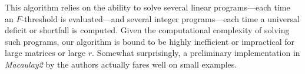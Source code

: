 \documentclass{amsart}
\begin{document}
\begin{remark}[An algorithm]
  This algorithm relies on the ability to solve several linear programs---each time an $F$-threshold is evaluated---and several integer programs---each time a universal deficit or shortfall is computed.
   Given the computational complexity of solving such programs, our algorithm is bound to be highly inefficient or impractical for large matrices or large $r$.
   Somewhat surprisingly, a preliminary implementation in \emph{Macaulay2} \cite{M2} by the authors actually fares well on small examples.
\end{remark}

\end{document}
